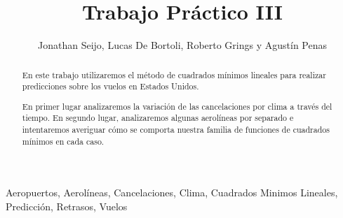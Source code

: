 \documentclass{endm}
\begin{document}
\setlength{\abovedisplayskip}{1cm}
\setlength{\belowdisplayskip}{1cm}

\begin{frontmatter}


\title{Trabajo Práctico III}

\author{Jonathan Seijo, Lucas De Bortoli, Roberto Grings y Agustín Penas}
\address{Departamento de computación\\ Universidad de Buenos Aires\\ Buenos Aires, Argentina\\}


\begin{abstract}

En este trabajo utilizaremos el método de cuadrados mínimos lineales para realizar predicciones sobre los vuelos en Estados Unidos.

En primer lugar analizaremos la variación de las cancelaciones por clima a través del tiempo. En segundo lugar, analizaremos algunas aerolíneas por separado e intentaremos averiguar cómo se comporta nuestra familia de funciones de cuadrados mínimos en cada caso.

\end{abstract}

\begin{keyword}
Aeropuertos, Aerolíneas, Cancelaciones, Clima, Cuadrados Minimos Lineales, Predicción, Retrasos, Vuelos
\end{keyword}

\end{frontmatter}

\newpage



\end{document}
